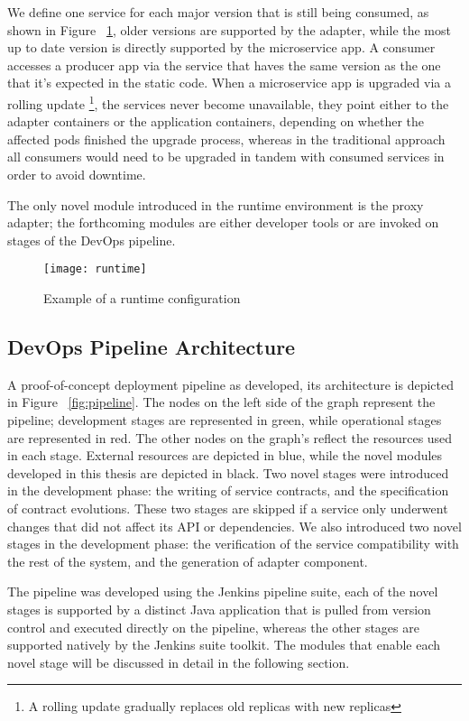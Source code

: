 We define one service for each major version that is still being consumed, as shown in Figure ~\ref{fig:runtime},
older versions are supported by the adapter, while the most up to date version is directly supported by the microservice app.
A consumer accesses a producer app via the service that haves the same version as the one that it's expected in the static code.
When a microservice app is upgraded via a rolling update \footnote{A rolling update gradually replaces old replicas with new replicas},
the services never become unavailable, they point either to the adapter containers or the application containers, depending on whether the affected pods finished the upgrade process,
whereas in the traditional approach all consumers would need to be upgraded in tandem with consumed services in order to avoid downtime.

The only novel module introduced in the runtime environment is the proxy adapter;
the forthcoming modules are either developer tools or are invoked on stages of the DevOps pipeline.

\begin{figure}[htbp]
    \centering
    \texttt{[image: runtime]}
    \caption{Example of a runtime configuration}
    \label{fig:runtime}
\end{figure}

\subsection{DevOps Pipeline Architecture} %
\label{sec:devops_pipeline_architecture}

A proof-of-concept deployment pipeline as developed, its architecture is depicted in Figure ~\ref{fig:pipeline}.
The nodes on the left side of the graph represent the pipeline;
development stages are represented in green, while operational stages are represented in red.
The other nodes on the graph's reflect the resources used in each stage.
External resources are depicted in blue, while the novel modules developed in this thesis are depicted in black.
Two novel stages were introduced in the development phase: the writing of service contracts, and the specification of contract evolutions.
These two stages are skipped if a service only underwent changes that did not affect its API or dependencies.
We also introduced two novel stages in the development phase:
the verification of the service compatibility with the rest of the system, and the generation of adapter component.

The pipeline was developed using the Jenkins pipeline suite, each of the novel stages is supported by a distinct Java application that is pulled from version control
and executed directly on the pipeline, whereas the other stages are supported natively by the Jenkins suite toolkit.
The modules that enable each novel stage will be discussed in detail in the following section.

